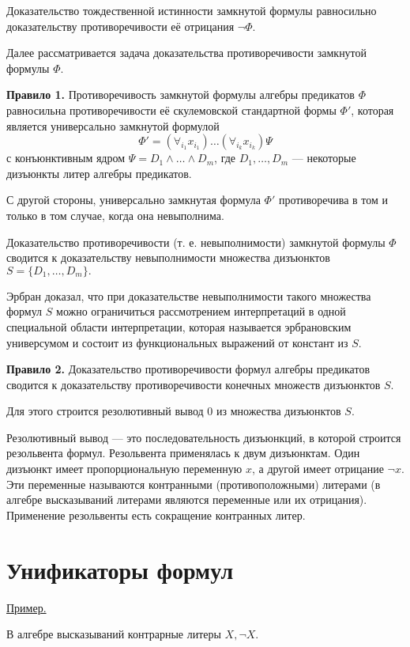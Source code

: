 Доказательство тождественной истинности замкнутой формулы  равносильно доказательству противоречивости её отрицания $\neg \Phi$.

Далее рассматривается задача доказательства противоречивости замкнутой формулы $\Phi$.

{\bf Правило 1.} Противоречивость замкнутой формулы алгебры предикатов $\Phi$ равносильна противоречивости её скулемовской стандартной формы $\Phi'$, которая является универсально замкнутой формулой
\begin{equation*}
    \Phi' = (\forall_{i_1}x_{i_1})\dots(\forall_{i_k}x_{i_k})\Psi
\end{equation*}
с конъюнктивным ядром $\Psi = D_1\land\dots\land D_m$, где $D_1,\dots,D_m$ --- некоторые дизъюнкты литер алгебры предикатов.

С другой стороны, универсально замкнутая формула $\Phi'$ противоречива в том и только в том случае, когда она невыполнима.

Доказательство противоречивости (т. е. невыполнимости) замкнутой формулы $\Phi$ сводится к доказательству невыполнимости множества дизъюнктов $S = \{D_1,\dots,D_m\}.$

Эрбран доказал, что при доказательстве невыполнимости такого множества формул $S$ можно ограничиться рассмотрением интерпретаций в одной специальной области интерпретации, которая называется эрбрановским универсумом и состоит из функциональных выражений от констант из $S$.

{\bf Правило 2.} Доказательство противоречивости формул алгебры предикатов сводится к доказательству противоречивости конечных множеств дизъюнктов $S$.

Для этого строится резолютивный вывод 0 из множества дизъюнктов $S$.

Резолютивный вывод --- это последовательность дизъюнкций, в которой строится резольвента формул. Резольвента применялась к двум дизъюнктам. Один дизъюнкт имеет пропорциональную переменную $x$, а другой имеет отрицание $\neg x$. Эти переменные называются контранными (противоположными) литерами (в алгебре высказываний литерами являются переменные или их отрицания). Применение резольвенты есть сокращение контранных литер.

\section{Унификаторы формул}

\underline{Пример.}

В алгебре высказываний контрарные литеры $X, \neg X$.

